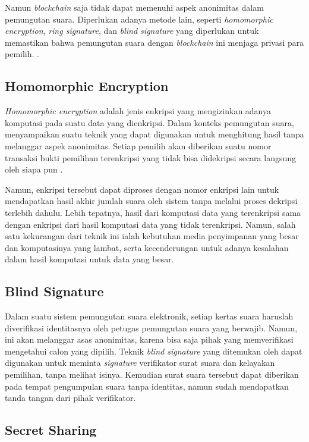 Namun \textit{blockchain} saja tidak dapat memenuhi aspek anonimitas dalam pemungutan suara. Diperlukan adanya metode lain, seperti \textit{homomorphic encryption}, \textit{ring signature}, dan \textit{blind signature} yang diperlukan untuk memastikan bahwa pemungutan suara dengan \textit{blockchain} ini menjaga privasi para pemilih. \citep{koreanevoting}.

\subsection{Homomorphic Encryption}

\textit{Homomorphic encryption} adalah jenis enkripsi yang mengizinkan adanya komputasi pada suatu data yang dienkripsi. Dalam konteks pemungutan suara, \cite{end2end} menyampaikan suatu teknik yang dapat digunakan untuk menghitung hasil tanpa melanggar aspek anonimitas. Setiap pemilih akan diberikan suatu nomor transaksi bukti pemilihan terenkripsi yang tidak bisa didekripsi secara langsung oleh siapa pun \citep{homomorphic2}.

Namun, enkripsi tersebut dapat diproses dengan nomor enkripsi lain untuk mendapatkan hasil akhir jumlah suara oleh sistem tanpa melalui proses dekripsi terlebih dahulu. Lebih tepatnya, hasil dari komputasi data yang terenkripsi sama dengan enkripsi dari hasil komputasi data yang tidak terenkripsi. Namun, salah satu kekurangan dari teknik ini ialah kebutuhan media penyimpanan yang besar dan komputasinya yang lambat, serta kecenderungan untuk adanya kesalahan dalam hasil komputasi untuk data yang besar. \citep{homomorphic1} 

\subsection{Blind Signature}

Dalam suatu sistem pemungutan suara elektronik, setiap kertas suara haruslah diverifikasi identitasnya oleh petugas pemungutan suara yang berwajib. Namun, ini akan melanggar asas anonimitas, karena bisa saja pihak yang memverifikasi mengetahui calon yang dipilih. Teknik \textit{blind signature} yang ditemukan oleh \cite{mixnet} dapat digunakan untuk meminta \textit{signature} verifikator surat suara dan kelayakan pemilihan, tanpa melihat isinya. Kemudian surat suara tersebut dapat diberikan pada tempat pengumpulan suara tanpa identitas, namun sudah mendapatkan tanda tangan dari pihak verifikator.

\subsection{Secret Sharing}

